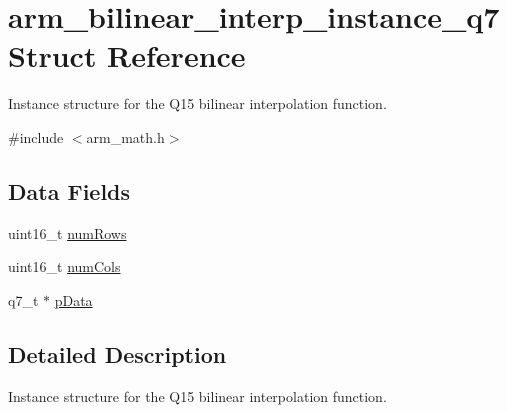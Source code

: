\hypertarget{structarm__bilinear__interp__instance__q7}{\section{arm\-\_\-bilinear\-\_\-interp\-\_\-instance\-\_\-q7 Struct Reference}
\label{structarm__bilinear__interp__instance__q7}
}


Instance structure for the Q15 bilinear interpolation function.  




{\ttfamily \#include $<$arm\-\_\-math.\-h$>$}

\subsection*{Data Fields}
\begin{DoxyCompactItemize}
\item 
uint16\-\_\-t \hyperlink{structarm__bilinear__interp__instance__q7_a1bcf80ccdc2acc29198f1592ae300390}{num\-Rows}
\item 
uint16\-\_\-t \hyperlink{structarm__bilinear__interp__instance__q7_a4bb5ec0d13eb4c9cf887aa8366a44117}{num\-Cols}
\item 
q7\-\_\-t $\ast$ \hyperlink{structarm__bilinear__interp__instance__q7_afde7546ea2ec5df9fe42fb04d128a016}{p\-Data}
\end{DoxyCompactItemize}


\subsection{Detailed Description}
Instance structure for the Q15 bilinear interpolation function. 

